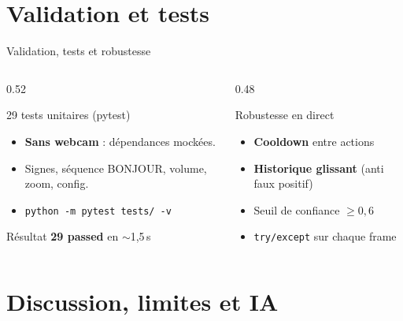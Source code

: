 \documentclass[aspectratio=169,12pt]{beamer}
\begin{document}
\section{Validation et tests}

\begin{frame}{Validation, tests et robustesse}
  \begin{columns}
    \begin{column}{0.52\textwidth}
      \begin{block}{29 tests unitaires (pytest)}
        \begin{itemize}
          \item \textbf{Sans webcam} : d\'ependances mock\'ees.
          \item Signes, s\'equence BONJOUR, volume, zoom, config.
          \item \texttt{python -m pytest tests/ -v}
        \end{itemize}
      \end{block}
      \begin{exampleblock}{R\'esultat}
        \textbf{29 passed} en $\sim$1,5\,s
      \end{exampleblock}
    \end{column}
    \begin{column}{0.48\textwidth}
      \begin{block}{Robustesse \og en direct \fg}
        \begin{itemize}
          \item \textbf{Cooldown} entre actions
          \item \textbf{Historique glissant} (anti faux positif)
          \item Seuil de confiance $\geq 0{,}6$
          \item \texttt{try/except} sur chaque frame
        \end{itemize}
      \end{block}
    \end{column}
  \end{columns}
\end{frame}

\section{Discussion, limites et IA}
\end{document}

